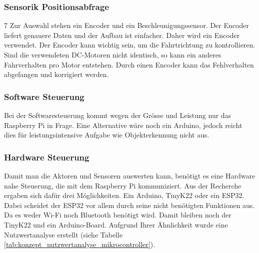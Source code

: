 \documentclass[../main.tex]{subfiles}
\begin{document}
\subsubsection{Sensorik Positionsabfrage}7
\label{a3:Sensorik:Positionsabfrage}
Zur Auswahl stehen ein Encoder und ein Beschleunigungssensor. Der Encoder liefert genauere Daten und der Aufbau ist einfacher. Daher wird ein Encoder verwendet. Der Encoder kann wichtig sein, um die Fahrtrichtung zu kontrollieren. Sind die verwendeten DC-Motoren nicht identisch, so kann ein anderes Fahrverhalten pro Motor entstehen. Durch einen Encoder kann das Fehlverhalten abgefangen und korrigiert werden.

\subsubsection{Software Steuerung}
Bei der Softwaresteuerung kommt wegen der Grösse und Leistung nur das Raspberry Pi in Frage.
Eine Alternative wäre noch ein Arduino, jedoch reicht dies für leistungsintensive Aufgabe wie
Objekterkennung nicht aus.

\newpage

\subsubsection{Hardware Steuerung}
\label{a3:Hardware Steuerung}
Damit man die Aktoren und Sensoren auswerten kann, benötigt es eine Hardware nahe Steuerung, die mit dem Raspberry Pi kommuniziert. Aus der Recherche ergaben sich dafür drei Möglichkeiten. Ein Arduino, TinyK22 oder ein ESP32. Dabei scheidet der ESP32 vor allem durch seine nicht benötigten Funktionen aus. Da es weder Wi-Fi noch Bluetooth benötigt wird. Damit bleiben noch der TinyK22 und ein Arduino-Board. Aufgrund Ihrer Ähnlichkeit wurde eine Nutzwertanalyse erstellt (siehe Tabelle \ref{tab:konzept_nutzwertanalyse_mikrocontroller}).
\end{document}
